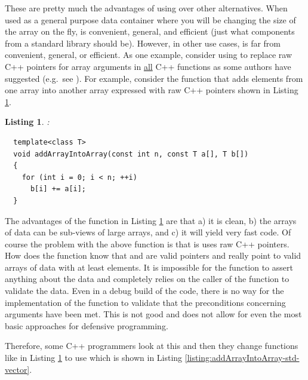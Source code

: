 \documentclass[pdf,ps2pdf,11pt]{SANDreport}
\newtheorem{listing}{Listing}
\begin{document}
These are pretty much the advantages of using {} over
other alternatives.  When used as a general purpose data container
where you will be changing the size of the array on the fly,
{} is convenient, general, and efficient (just what
components from a standard library should be).  However, in other use
cases, {} is far from convenient, general, or
efficient.  As one example, consider using {} to
replace raw C++ pointers for array arguments in {}\underline{all} C++
functions as some authors have suggested (e.g.\ see
{}\cite{Modernizing-the-C++-Interface-to-MPI}).  For example, consider
the function that adds elements from one array into another array
expressed with raw C++ pointers shown in Listing
{}\ref{listing:addArrayIntoArray-raw}.

\begin{listing}:\\
\label{listing:addArrayIntoArray-raw}
{\small\begin{verbatim}
  template<class T>
  void addArrayIntoArray(const int n, const T a[], T b[])
  {
    for (int i = 0; i < n; ++i)
      b[i] += a[i];
  }
\end{verbatim}}
\end{listing}

The advantages of the function in Listing
{}\ref{listing:addArrayIntoArray-raw} are that a) it is clean, b) the
arrays of data can be sub-views of large arrays, and c) it will yield
very fast code.  Of course the problem with the above function
{} is that is uses raw C++ pointers.  How
does the function {} know that
{} and {} are valid pointers and really point to
valid arrays of data with at least {} elements.  It is
impossible for the function {} to
assert anything about the data and completely relies on the caller of
the function to validate the data.  Even in a debug build of the code,
there is no way for the implementation of the function
{} to validate that the preconditions
concerning arguments have been met.  This is not good and does not
allow for even the most basic approaches for defensive programming.

Therefore, some C++ programmers look at this and then they change
functions like {} in Listing
{}\ref{listing:addArrayIntoArray-raw} to use {}
which is shown in Listing
{}\ref{listing:addArrayIntoArray-std-vector}.
\end{document}
